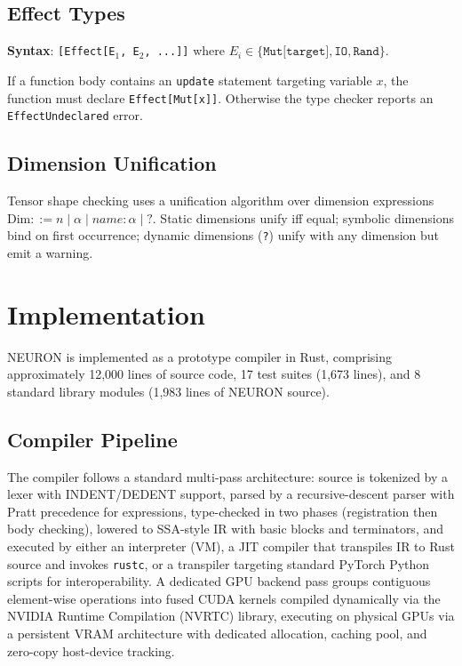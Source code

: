 \documentclass[11pt,a4paper]{article}
\newcommand{\ty}[1]{\texttt{#1}}
\begin{document}
\subsection{Effect Types}
\label{sec:effects}

\textbf{Syntax}: \ty{[Effect[E$_1$, E$_2$, ...]]} where $E_i \in \{\ty{Mut[target]}, \ty{IO}, \ty{Rand}\}$.

If a function body contains an \ty{update} statement targeting variable $x$, the function must declare \ty{Effect[Mut[x]]}. Otherwise the type checker reports an \ty{EffectUndeclared} error.

\subsection{Dimension Unification}

Tensor shape checking uses a unification algorithm over dimension expressions $\text{Dim} ::= n \mid \alpha \mid \textit{name}{:}\alpha \mid \texttt{?}$. Static dimensions unify iff equal; symbolic dimensions bind on first occurrence; dynamic dimensions (\texttt{?}) unify with any dimension but emit a warning.


\section{Implementation}

NEURON is implemented as a prototype compiler in Rust, comprising approximately 12,000 lines of source code, 17 test suites (1,673 lines), and 8 standard library modules (1,983 lines of NEURON source).

\subsection{Compiler Pipeline}

The compiler follows a standard multi-pass architecture: source is tokenized by a lexer with INDENT/DEDENT support, parsed by a recursive-descent parser with Pratt precedence for expressions, type-checked in two phases (registration then body checking), lowered to SSA-style IR with basic blocks and terminators, and executed by either an interpreter (VM), a JIT compiler that transpiles IR to Rust source and invokes \texttt{rustc}, or a transpiler targeting standard PyTorch Python scripts for interoperability. A dedicated GPU backend pass groups contiguous element-wise operations into fused CUDA kernels compiled dynamically via the NVIDIA Runtime Compilation (NVRTC) library, executing on physical GPUs via a persistent VRAM architecture with dedicated allocation, caching pool, and zero-copy host-device tracking.
\end{document}
